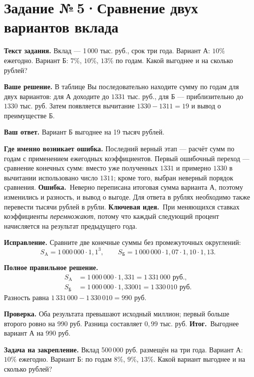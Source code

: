 \documentclass[a4paper,11pt]{article}
\newcommand{\err}{\textcolor{red!75!black}{\textbf{Ошибка.}}\ }
\newcommand{\idea}{\textcolor{accent}{\textbf{Ключевая идея.}}\ }
\newcommand{\result}{\textcolor{accent}{\textbf{Итог.}}\ }
\newcommand{\task}[2]{\clearpage\phantomsection\label{task:#1}\section*{Задание №\,#1\;·\;#2}}
\newcommand{\labelp}[1]{\par\smallskip\textbf{#1.}\enspace}
\begin{document}
\task{5}{Сравнение двух вариантов вклада}
\labelp{Текст задания} Вклад --- 1\,000 тыс. руб., срок три года. Вариант А: $10\%$ ежегодно. Вариант Б: $7\%$, $10\%$, $13\%$ по годам. Какой выгоднее и на сколько рублей?
\labelp{Ваше решение} В таблице Вы последовательно находите сумму по годам для двух вариантов: для А доходите до $1331$ тыс. руб., для Б --- приблизительно до $1330$ тыс. руб. Затем появляется вычитание $1330-1311=19$ и вывод о преимуществе Б.
\labelp{Ваш ответ} Вариант Б выгоднее на 19 тысяч рублей.
\labelp{Где именно возникает ошибка} Последний верный этап --- расчёт сумм по годам с применением ежегодных коэффициентов. Первый ошибочный переход --- сравнение конечных сумм: вместо уже полученных $1331$ и примерно $1330$ в вычитании использовано число $1311$; кроме того, выбран неверный порядок сравнения.
\err Неверно переписана итоговая сумма варианта А, поэтому изменились и разность, и вывод о выгоде. Для ответа в рублях необходимо также перевести тысячи рублей в рубли.
\idea При меняющихся ставках коэффициенты \emph{перемножают}, потому что каждый следующий процент начисляется на результат предыдущего года.
\labelp{Исправление} Сравните две конечные суммы без промежуточных округлений:
\[S_{\mathrm A}=1\,000\,000\cdot1{,}1^3,\qquad
S_{\text{Б}}=1\,000\,000\cdot1{,}07\cdot1{,}10\cdot1{,}13.\]
\labelp{Полное правильное решение}
\begin{align*}
S_{\mathrm A}&=1\,000\,000\cdot1{,}331=1\,331\,000\text{ руб.},\\
S_{\text{Б}}&=1\,000\,000\cdot1{,}33001=1\,330\,010\text{ руб.}
\end{align*}
Разность равна $1\,331\,000-1\,330\,010=990$ руб.
\labelp{Проверка} Оба результата превышают исходный миллион; первый больше второго ровно на 990 руб. Разница составляет $0{,}99$ тыс. руб.
\result Выгоднее вариант А на 990 руб.
\labelp{Задача на закрепление} Вклад 500\,000 руб. размещён на три года. Вариант А: $10\%$ ежегодно. Вариант Б: по годам $8\%$, $9\%$, $13\%$. Какой вариант выгоднее и на сколько рублей?
\end{document}
